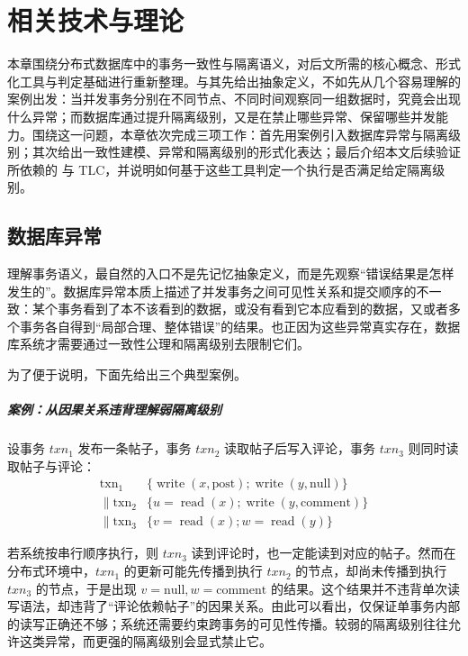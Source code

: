 \chapter{相关技术与理论}

本章围绕分布式数据库中的事务一致性与隔离语义，对后文所需的核心概念、形式化工具与判定基础进行重新整理。与其先给出抽象定义，不如先从几个容易理解的案例出发：当并发事务分别在不同节点、不同时间观察同一组数据时，究竟会出现什么异常；而数据库通过提升隔离级别，又是在禁止哪些异常、保留哪些并发能力。围绕这一问题，本章依次完成三项工作：首先用案例引入数据库异常与隔离级别；其次给出一致性建模、异常和隔离级别的形式化表达；最后介绍本文后续验证所依赖的 \TLAPlus 与 TLC，并说明如何基于这些工具判定一个执行是否满足给定隔离级别。

\section{数据库异常}
理解事务语义，最自然的入口不是先记忆抽象定义，而是先观察“错误结果是怎样发生的”。数据库异常本质上描述了并发事务之间可见性关系和提交顺序的不一致：某个事务看到了本不该看到的数据，或没有看到它本应看到的数据，又或者多个事务各自得到“局部合理、整体错误”的结果。也正因为这些异常真实存在，数据库系统才需要通过一致性公理和隔离级别去限制它们。

为了便于说明，下面先给出三个典型案例。

\paragraph*{案例：从因果关系违背理解弱隔离级别}
设事务 $txn_1$ 发布一条帖子，事务 $txn_2$ 读取帖子后写入评论，事务 $txn_3$ 则同时读取帖子与评论：
\begin{equation}
    \begin{aligned}
        \operatorname{txn_1}    & \{\operatorname{write}(x, \text{post}); \operatorname{write}(y, \text{null})\} \\
        \| \operatorname{txn_2} & \{u=\operatorname{read}(x) ; \operatorname{write}(y, \text{comment})\}         \\
        \| \operatorname{txn_3} & \{v=\operatorname{read}(x) ; w=\operatorname{read}(y)\}
    \end{aligned}
\end{equation}

若系统按串行顺序执行，则 $txn_3$ 读到评论时，也一定能读到对应的帖子。然而在分布式环境中，$txn_1$ 的更新可能先传播到执行 $txn_2$ 的节点，却尚未传播到执行 $txn_3$ 的节点，于是出现 $v=\text{null}, w=\text{comment}$ 的结果。这个结果并不违背单次读写语法，却违背了“评论依赖帖子”的因果关系。由此可以看出，仅保证单事务内部的读写正确还不够；系统还需要约束跨事务的可见性传播。较弱的隔离级别往往允许这类异常，而更强的隔离级别会显式禁止它。

